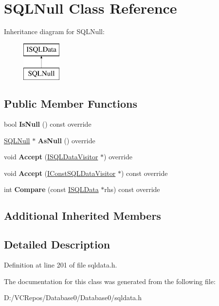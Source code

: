 \hypertarget{class_s_q_l_null}{}\section{S\+Q\+L\+Null Class Reference}
\label{class_s_q_l_null}
Inheritance diagram for S\+Q\+L\+Null\+:\begin{figure}[H]
\begin{center}
\leavevmode
\includegraphics[height=2.000000cm]{class_s_q_l_null}
\end{center}
\end{figure}
\subsection*{Public Member Functions}
\begin{DoxyCompactItemize}
\item 
\mbox{\label{class_s_q_l_null_aa10ac8b0c675c78cd919a6005156258c}} 
bool {\bfseries Is\+Null} () const override
\item 
\mbox{\label{class_s_q_l_null_ac5742909ad1361b9c509d70a5111b415}} 
\mbox{\hyperlink{class_s_q_l_null}{S\+Q\+L\+Null}} $\ast$ {\bfseries As\+Null} () override
\item 
\mbox{\label{class_s_q_l_null_a91e52878b17c4a73ae610229028ba55e}} 
void {\bfseries Accept} (\mbox{\hyperlink{class_i_s_q_l_data_visitor}{I\+S\+Q\+L\+Data\+Visitor}} $\ast$) override
\item 
\mbox{\label{class_s_q_l_null_a14eb2d219f739be1a274119765ec0403}} 
void {\bfseries Accept} (\mbox{\hyperlink{class_i_const_s_q_l_data_visitor}{I\+Const\+S\+Q\+L\+Data\+Visitor}} $\ast$) const override
\item 
\mbox{\label{class_s_q_l_null_a3c2a3bbe5438deaf7f59b786066477aa}} 
int {\bfseries Compare} (const \mbox{\hyperlink{class_i_s_q_l_data}{I\+S\+Q\+L\+Data}} $\ast$rhs) const override
\end{DoxyCompactItemize}
\subsection*{Additional Inherited Members}


\subsection{Detailed Description}


Definition at line 201 of file sqldata.\+h.



The documentation for this class was generated from the following file\+:\begin{DoxyCompactItemize}
\item 
D\+:/\+V\+C\+Repos/\+Database0/\+Database0/sqldata.\+h\end{DoxyCompactItemize}
